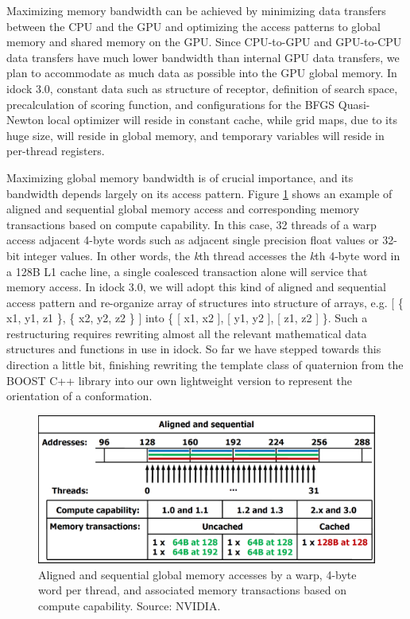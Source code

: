 Maximizing memory bandwidth can be achieved by minimizing data transfers between the CPU and the GPU and optimizing the access patterns to global memory and shared memory on the GPU. Since CPU-to-GPU and GPU-to-CPU data transfers have much lower bandwidth than internal GPU data transfers, we plan to accommodate as much data as possible into the GPU global memory. In idock 3.0, constant data such as structure of receptor, definition of search space, precalculation of scoring function, and configurations for the BFGS Quasi-Newton local optimizer will reside in constant cache, while grid maps, due to its huge size, will reside in global memory, and temporary variables will reside in per-thread registers.

Maximizing global memory bandwidth is of crucial importance, and its bandwidth depends largely on its access pattern. Figure \ref{GPU:AlignedSequentialGlobalMemoryAccess} shows an example of aligned and sequential global memory access and corresponding memory transactions based on compute capability. In this case, 32 threads of a warp access adjacent 4-byte words such as adjacent single precision float values or 32-bit integer values. In other words, the \textit{k}th thread accesses the \textit{k}th 4-byte word in a 128B L1 cache line, a single coalesced transaction alone will service that memory access. In idock 3.0, we will adopt this kind of aligned and sequential access pattern and re-organize array of structures into structure of arrays, e.g.  [ \{ x1, y1, z1 \}, \{ x2, y2, z2 \} ] into \{ [ x1, x2 ], [ y1, y2 ], [ z1, z2 ] \}. Such a restructuring requires rewriting almost all the relevant mathematical data structures and functions in use in idock. So far we have stepped towards this direction a little bit, finishing rewriting the template class of quaternion from the BOOST C++ library into our own lightweight version to represent the orientation of a conformation.

\begin{figure}
\centering
\includegraphics[width=\linewidth]{GPU/AlignedSequentialGlobalMemoryAccess.png}
\caption{Aligned and sequential global memory accesses by a warp, 4-byte word per thread, and associated memory transactions based on compute capability. Source: NVIDIA.}
\label{GPU:AlignedSequentialGlobalMemoryAccess}
\end{figure}

